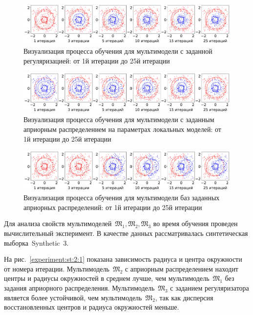 \documentclass[12pt, twoside]{article}
\numberwithin{equation}{section}
\begin{document}
\begin{figure}[h!t]\center
\includegraphics[width=1\textwidth]{result/experiment_synt_regular_progress}
\caption{Визуализация процесса обучения для мультимодели с заданной регуляризацией: от 1й итерации до  25й итерации}
\label{experiment:st:2:3}
\end{figure}

\begin{figure}[h!t]\center
\includegraphics[width=1\textwidth]{result/experiment_synt_prior_progress}
\caption{Визуализация процесса обучения для мультимодели с заданным априорным распределением на параметрах локальных моделей: от 1й итерации до 25й итерации}
\label{experiment:st:2:4}
\end{figure}

\begin{figure}[h!t]\center
\includegraphics[width=1\textwidth]{result/experiment_synt_not_prior_progress}
\caption{Визуализация процесса обучения для мультимодели баз заданных априорных распределений: от 1й итерации до 25й итерации}
\label{experiment:st:2:5}
\end{figure}
Для анализа свойств мультимоделей~$\mathfrak{M}_1, \mathfrak{M}_2, \mathfrak{M}_3$ во время обучения проведен вычислительный эксперимент. В качестве данных рассматривалась синтетическая выборка~Synthetic~3.

На рис.~\ref{experiment:st:2:1} показана зависимость радиуса и центра окружности от номера итерации. Мультимодель~$\mathfrak{M}_2$ с априорным распределением находит центры и радиусы окружностей в среднем лучше, чем мультимодель~$\mathfrak{M}_1$ без задания априорного распределения. Мультимодель~$\mathfrak{M}_3$ с заданием регуляризатора является более устойчивой, чем мультимодель~$\mathfrak{M}_2$, так как дисперсия восстановленных центров и радиуса окружностей меньше.
\end{document}
